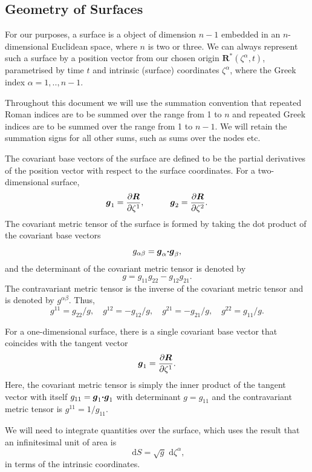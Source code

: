 \hypertarget{index_surface_representation}{}\subsection{Geometry of Surfaces}\label{index_surface_representation}
For our purposes, a surface is a object of dimension $n-1$ embedded in an $n\!$-\/dimensional Euclidean space, where $n$ is two or three. We can always represent such a surface by a position vector from our chosen origin $ \mathbf{R}^{*}(\zeta^{\alpha},t) $, parametrised by time $t$ and intrinsic (surface) coordinates $\zeta^{\alpha}$, where the Greek index $\alpha = 1,..,n-1$.

Throughout this document we will use the summation convention that repeated Roman indices are to be summed over the range from 1 to $n$ and repeated Greek indices are to be summed over the range from 1 to $n-1$. We will retain the summation signs for all other sums, such as sums over the nodes etc.

The covariant base vectors of the surface are defined to be the partial derivatives of the position vector with respect to the surface coordinates. For a two-\/dimensional surface, \[ \mbox{\boldmath$g$}_{1} = \frac{\partial\mbox{\boldmath$R$}}{\partial \zeta^{1}}, \quad \quad \quad \mbox{\boldmath$g$}_{2} = \frac{\partial\mbox{\boldmath$R$}}{\partial \zeta^{2}}. \] The covariant metric tensor of the surface is formed by taking the dot product of the covariant base vectors \[ g_{\alpha\beta} = \mbox{\boldmath$g$}_{\alpha}\mbox{\boldmath$\cdot$} \mbox{\boldmath$g$}_{\beta}, \] and the determinant of the covariant metric tensor is denoted by \[ g = g_{11}g_{22} - g_{12}g_{21}. \] The contravariant metric tensor is the inverse of the covariant metric tensor and is denoted by $ g^{\alpha\beta} $. Thus, \[ g^{11} = g_{22}/g, \quad g^{12} = -g_{12}/g, \quad g^{21} = - g_{21}/g, \quad g^{22} = g_{11}/g. \]

For a one-\/dimensional surface, there is a single covariant base vector that coincides with the tangent vector \[ \mbox{\boldmath$g$}_{1} = \frac{\partial \mbox{\boldmath$R$}}{\partial \zeta^1}.\] Here, the covariant metric tensor is simply the inner product of the tangent vector with itself $ g_{11} = \mbox{\boldmath$g$}_{1} \mbox{\boldmath$\cdot g$}_{1} $ with determinant $ g = g_{11} $ and the contravariant metric tensor is $ g^{11} = 1/g_{11} $.

We will need to integrate quantities over the surface, which uses the result that an infinitesimal unit of area is \[ \mbox{ d}S = \sqrt{g} \mbox{ d}\zeta^{\alpha}, \] in terms of the intrinsic coordinates.

